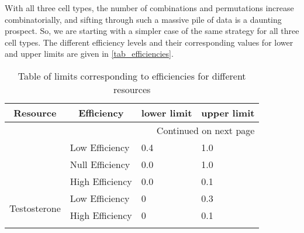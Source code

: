 With all three cell types, the number of combinations and permutations increase combinatorially, and sifting through such a massive pile of data is a daunting prospect. So, we are starting with a simpler case of the same strategy for all three cell types. The different efficiency levels and their corresponding values for lower and upper limits are given in \autoref{tab_efficiencies}.

\begin{longtable}[c]{|l|l|l|l|}
  \hline  \multicolumn{1}{|c|}{\textbf{Resource}} & \multicolumn{1}{c|}{\textbf{Efficiency}} & \multicolumn{1}{c|}{\textbf{lower limit}} & \multicolumn{1}{c|}{\textbf{upper limit}}  \\ \hline
  \endhead

  \hline \multicolumn{4}{|r|}{{Continued on next page}} \\ \hline
  \endfoot

  \endlastfoot

  \multirow{3}{*}{Oxygen} & Low Efficiency & 0.4 & 1.0 \\ \cline{2-4}
  & Null Efficiency & 0.0 & 1.0 \\ \cline{2-4}
  & High Efficiency & 0.0 & 0.1 \\ \hline
  \multirow{3}{*}{Testosterone} & Low Efficiency & 0 & 0.3 \\ \cline{2-4}
  & High Efficiency & 0 & 0.1 \\ \hline

  \caption{Table of limits corresponding to efficiencies for different resources}
  \label{tab_efficiencies}
\end{longtable}

